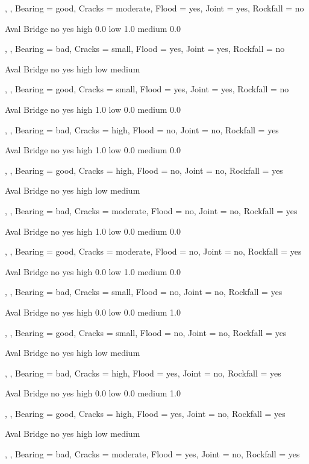 , , Bearing = good, Cracks = moderate, Flood = yes, Joint = yes, Rockfall = no

        Aval
Bridge    no yes
  high   0.0    
  low    1.0    
  medium 0.0    

, , Bearing = bad, Cracks = small, Flood = yes, Joint = yes, Rockfall = no

        Aval
Bridge   no yes
  high         
  low          
  medium       

, , Bearing = good, Cracks = small, Flood = yes, Joint = yes, Rockfall = no

        Aval
Bridge    no yes
  high   1.0    
  low    0.0    
  medium 0.0    

, , Bearing = bad, Cracks = high, Flood = no, Joint = no, Rockfall = yes

        Aval
Bridge    no yes
  high   1.0    
  low    0.0    
  medium 0.0    

, , Bearing = good, Cracks = high, Flood = no, Joint = no, Rockfall = yes

        Aval
Bridge   no yes
  high         
  low          
  medium       

, , Bearing = bad, Cracks = moderate, Flood = no, Joint = no, Rockfall = yes

        Aval
Bridge   no yes
  high      1.0
  low       0.0
  medium    0.0

, , Bearing = good, Cracks = moderate, Flood = no, Joint = no, Rockfall = yes

        Aval
Bridge    no yes
  high   0.0    
  low    1.0    
  medium 0.0    

, , Bearing = bad, Cracks = small, Flood = no, Joint = no, Rockfall = yes

        Aval
Bridge   no yes
  high      0.0
  low       0.0
  medium    1.0

, , Bearing = good, Cracks = small, Flood = no, Joint = no, Rockfall = yes

        Aval
Bridge   no yes
  high         
  low          
  medium       

, , Bearing = bad, Cracks = high, Flood = yes, Joint = no, Rockfall = yes

        Aval
Bridge   no yes
  high      0.0
  low       0.0
  medium    1.0

, , Bearing = good, Cracks = high, Flood = yes, Joint = no, Rockfall = yes

        Aval
Bridge   no yes
  high         
  low          
  medium       

, , Bearing = bad, Cracks = moderate, Flood = yes, Joint = no, Rockfall = yes

